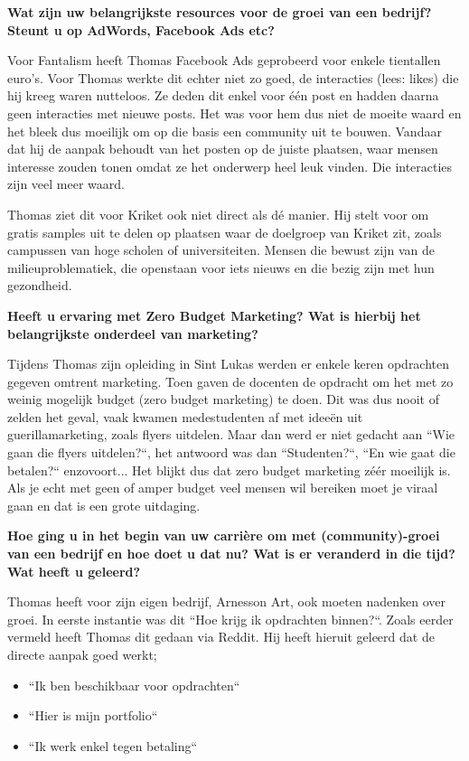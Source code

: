 \textbf{Wat zijn uw belangrijkste resources voor de groei van een bedrijf? Steunt u op AdWords, Facebook Ads etc?}
	
Voor Fantalism heeft Thomas Facebook Ads geprobeerd voor enkele tientallen euro's. Voor Thomas werkte dit echter niet zo goed, de interacties (lees: likes) die hij kreeg waren nutteloos. Ze deden dit enkel voor één post en hadden daarna geen interacties met nieuwe posts. Het was voor hem dus niet de moeite waard en het bleek dus moeilijk om op die basis een community uit te bouwen. Vandaar dat hij de aanpak behoudt van het posten op de juiste plaatsen, waar mensen interesse zouden tonen omdat ze het onderwerp heel leuk vinden. Die interacties zijn veel meer waard.

Thomas ziet dit voor Kriket ook niet direct als dé manier. Hij stelt voor om gratis samples uit te delen op plaatsen waar de doelgroep van Kriket zit, zoals campussen van hoge scholen of universiteiten. Mensen die bewust zijn van de milieuproblematiek, die openstaan voor iets nieuws en die bezig zijn met hun gezondheid.
	
	
\textbf{Heeft u ervaring met Zero Budget Marketing? Wat is hierbij het belangrijkste onderdeel van marketing?}
	
Tijdens Thomas zijn opleiding in Sint Lukas werden er enkele keren opdrachten gegeven omtrent marketing. Toen gaven de docenten de opdracht om het met zo weinig mogelijk budget (zero budget marketing) te doen. Dit was dus nooit of zelden het geval, vaak kwamen medestudenten af met ideeën uit guerillamarketing, zoals flyers uitdelen. Maar dan werd er niet gedacht aan ``Wie gaan die flyers uitdelen?``, het antwoord was dan ``Studenten?``, ``En wie gaat die betalen?`` enzovoort... Het blijkt dus dat zero budget marketing zéér moeilijk is. Als je echt met geen of amper budget veel mensen wil bereiken moet je viraal gaan en dat is een grote uitdaging.
	
\textbf{Hoe ging u in het begin van uw carrière om met (community)-groei van een bedrijf en hoe doet u dat nu? Wat is er veranderd in die tijd? Wat heeft u geleerd?}
	
Thomas heeft voor zijn eigen bedrijf, Arnesson Art, ook moeten nadenken over groei. In eerste instantie was dit ``Hoe krijg ik opdrachten binnen?``. Zoals eerder vermeld heeft Thomas dit gedaan via Reddit. Hij heeft hieruit geleerd dat de directe aanpak goed werkt;

\begin{itemize} 
	\item ``Ik ben beschikbaar voor opdrachten``
	\item ``Hier is mijn portfolio``
	\item ``Ik werk enkel tegen betaling``
\end{itemize} 

